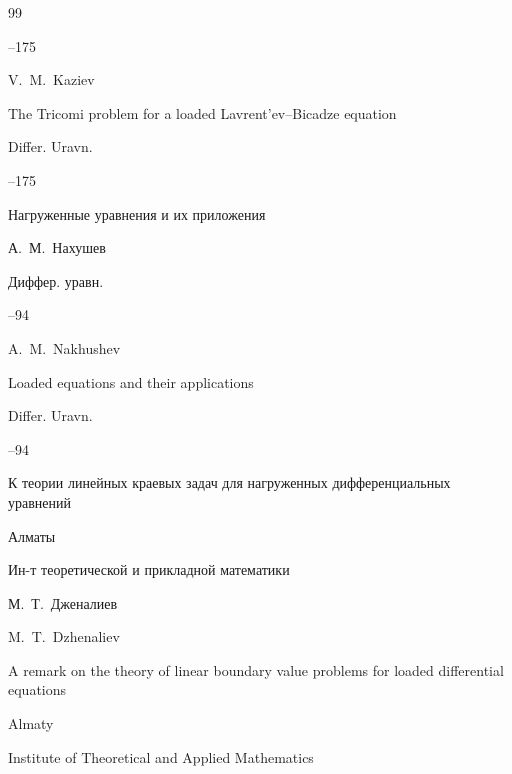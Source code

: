 \begin{thebibliography}{99}


--175

\misctransl

\by V.~M.~Kaziev 

\paper The Tricomi problem for a loaded Lavrent'ev--Bicadze equation

\jour Differ. Uravn.




–175




\paper Нагруженные уравнения и их приложения

\by А.~М.~Нахушев

\jour Диффер. уравн.




--94

\misctransl

\by A.~M.~Nakhushev 

\paper Loaded equations and their applications

\jour Differ. Uravn.




–94






\book К теории линейных краевых задач для нагруженных дифференциальных уравнений 

\publaddr Алматы

\publ Ин-т теоретической и прикладной математики

\by М.~Т.~Дженалиев



\misctransl

\by M.~T.~Dzhenaliev

\book A remark on the theory of linear boundary value problems for loaded differential equations

\publaddr Almaty

\publ Institute of Theoretical and Applied Mathematics


\end{thebibliography}
